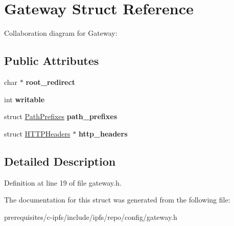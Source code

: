 \hypertarget{struct_gateway}{}\section{Gateway Struct Reference}
\label{struct_gateway}


Collaboration diagram for Gateway\+:
\subsection*{Public Attributes}
\begin{DoxyCompactItemize}
\item 
\mbox{\label{struct_gateway_ad40793ff5f41950baf041e2f06a887cd}} 
char $\ast$ {\bfseries root\+\_\+redirect}
\item 
\mbox{\label{struct_gateway_a992dfd5d6c79534cb93283c3e426bcd5}} 
int {\bfseries writable}
\item 
\mbox{\label{struct_gateway_adf356dd7422a948c266b38e001aabc0f}} 
struct \mbox{\hyperlink{struct_path_prefixes}{Path\+Prefixes}} {\bfseries path\+\_\+prefixes}
\item 
\mbox{\label{struct_gateway_a173755ec6563b20943405aa6332f1ef1}} 
struct \mbox{\hyperlink{struct_h_t_t_p_headers}{H\+T\+T\+P\+Headers}} $\ast$ {\bfseries http\+\_\+headers}
\end{DoxyCompactItemize}


\subsection{Detailed Description}


Definition at line 19 of file gateway.\+h.



The documentation for this struct was generated from the following file\+:\begin{DoxyCompactItemize}
\item 
prerequisites/c-\/ipfs/include/ipfs/repo/config/gateway.\+h\end{DoxyCompactItemize}
